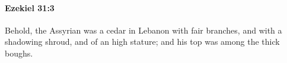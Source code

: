 
		\paragraph{Ezekiel 31:3} %
			\label{EZEKIEL-31-3}

			Behold, the Assyrian was a cedar in Lebanon with fair branches, and with a shadowing shroud, and of an high stature; and his top was among the thick boughs.


